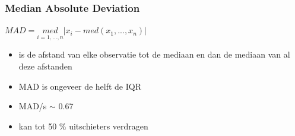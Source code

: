 \documentclass[titlepage]{article}
\numberwithin{equation}{section}
\begin{document}
\subsubsection{Median Absolute Deviation}
\begin{center}
$MAD = \underset{i=1, ... , n}{med} |x_{i} - med(x_{1}, ... , x_{n})|$
\end{center}
\begin{itemize}
	\item is de afstand van elke observatie tot de mediaan en dan de mediaan van al deze afstanden
	\item MAD is ongeveer de helft de IQR
	\item MAD/s $\sim$ 0.67
	\item kan tot 50 $\%$ uitschieters verdragen
\end{itemize}
\newpage
\end{document}
